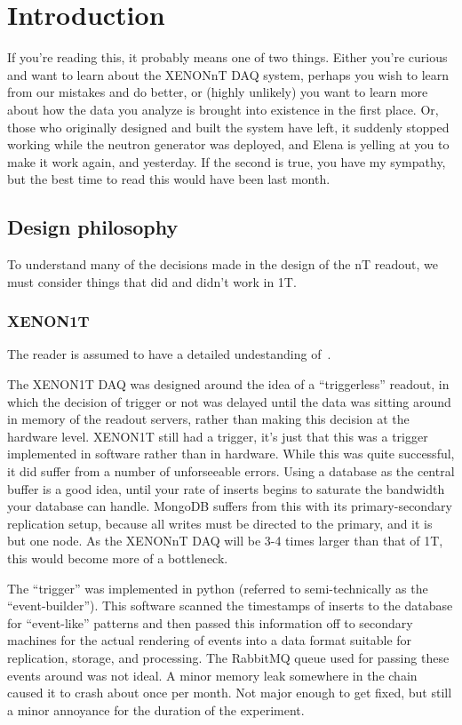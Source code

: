 \chapter{Introduction}\label{ch:intro}

If you're reading this, it probably means one of two things.
Either you're curious and want to learn about the XENONnT DAQ system, perhaps you wish to learn from our mistakes and do better, or (highly unlikely) you want to learn more about how the data you analyze is brought into existence in the first place.
Or, those who originally designed and built the system have left, it suddenly stopped working while the neutron generator was deployed, and Elena is yelling at you to make it work again, and yesterday.
If the second is true, you have my sympathy, but the best time to read this would have been last month.

\section{Design philosophy}\label{sec:philosophy}

To understand many of the decisions made in the design of the nT readout, we must consider things that did and didn't work in 1T.

\subsection{XENON1T}\label{sec:1tdaq}

The reader is assumed to have a detailed undestanding of~\cite{}.

The XENON1T DAQ was designed around the idea of a ``triggerless'' readout, in which the decision of trigger or not was delayed until the data was sitting around in memory of the readout servers, rather than making this decision at the hardware level.
XENON1T still had a trigger, it's just that this was a trigger implemented in software rather than in hardware.
While this was quite successful, it did suffer from a number of unforseeable errors.
Using a database as the central buffer is a good idea, until your rate of inserts begins to saturate the bandwidth your database can handle.
MongoDB suffers from this with its primary-secondary replication setup, because all writes must be directed to the primary, and it is but one node.
As the XENONnT DAQ will be 3-4 times larger than that of 1T, this would become more of a bottleneck.

The ``trigger'' was implemented in python (referred to semi-technically as the ``event-builder'').
This software scanned the timestamps of inserts to the database for ``event-like'' patterns and then passed this information off to secondary machines for the actual rendering of events into a data format suitable for replication, storage, and processing.
The RabbitMQ queue used for passing these events around was not ideal.
A minor memory leak somewhere in the chain caused it to crash about once per month.
Not major enough to get fixed, but still a minor annoyance for the duration of the experiment.

